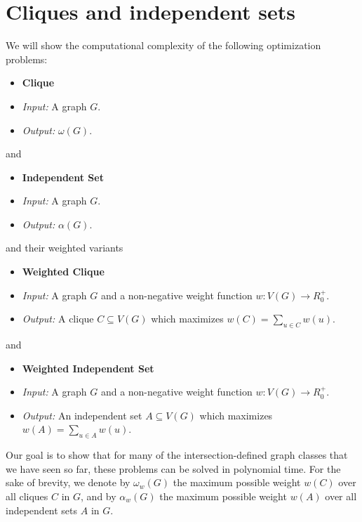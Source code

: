 \chapter{Cliques and independent sets}

We will show the computational complexity of the following optimization problems:

\begin{itemize}[]
	\item \textbf{Clique}
	\item \textit{Input:} A graph $G$.
	\item \textit{Output:} $\omega(G)$.
\end{itemize}

and

\begin{itemize} []
	\item \textbf{Independent Set}
	\item \textit{Input:} A graph $G$.
	\item \textit{Output:} $\alpha(G)$.
\end{itemize}

and their weighted variants

\begin{itemize}[]
	\item \textbf{Weighted Clique}
	\item \textit{Input:} A graph $G$ and a non-negative weight function $w : V(G) \to R_0^+$.
	\item \textit{Output:} A clique $C \subseteq V(G)$ which maximizes $w(C) = \sum_{u \in C} w(u)$.
\end{itemize}

and

\begin{itemize}[]
	\item \textbf{Weighted Independent Set}
	\item \textit{Input:} A graph $G$ and a non-negative weight function $w : V(G) \to R_0^+$.
	\item \textit{Output:} An independent set $A \subseteq V(G)$ which maximizes $w(A) = \sum_{u \in A} w(u)$.
\end{itemize}

Our goal is to show that for many of the intersection-defined graph classes that we have seen so far, these problems can be solved in polynomial time. For the sake of brevity, we denote by $\omega_w(G)$ the maximum possible weight $w(C)$ over all cliques $C$ in $G$, and by $\alpha_w(G)$ the maximum possible weight $w(A)$ over all independent sets $A$ in $G$.

